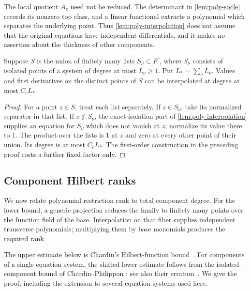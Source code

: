\begin{remark}\label{rem:poly-no-thickness-assumption}
The local quotient $A_z$ need not be reduced.  The determinant in \cref{lem:poly-socle} records its nonzero top class, and a linear functional extracts a polynomial which separates the underlying point. Thus \cref{lem:poly-interpolation} does not assume that the original equations have independent differentials, and it makes no assertion about the thickness of other components.
\end{remark}

\begin{lemma}
\label{lem:poly-union-interpolation}
Suppose $S$ is the union of finitely many lists $S_\nu\subset F^c$, where $S_\nu$ consists of isolated points of a system of degree at most $L_\nu\ge1$.  Put $L_*=\sum_\nu L_\nu$.  Values and first derivatives on the distinct points of $S$ can be interpolated at degree at most $C_cL_*$.
\end{lemma}

\begin{proof}
For a point $z\in S$, treat each list separately.  If $z\in S_\nu$, take its normalized separator in that list.  If $z\notin S_\nu$, the exact-isolation part of \cref{lem:poly-interpolation} supplies an equation for $S_\nu$ which does not vanish at $z$; normalize its value there to $1$.  The product over the lists is $1$ at $z$ and zero at every other point of their union.  Its degree is at most $C_cL_*$.  The first-order construction in the preceding proof costs a further fixed factor only.
\end{proof}

\subsection{Component Hilbert ranks}

We now relate polynomial restriction rank to total component degree. For the lower bound, a generic projection reduces the family to finitely many points over the function field of the base.  Interpolation on that fiber supplies independent transverse polynomials; multiplying them by base monomials produces the required rank.

The upper estimate below is Chardin's Hilbert-function bound~\cite{chardin1989}. For components of a single equation system, the shifted lower estimate follows from the isolated-component bound of Chardin--Philippon \cite[Corollary~3]{chardinphilippon1999}; see also their erratum~\cite{chardinphilippon2002erratum}. We give the proof, including the extension to several equation systems used here.

